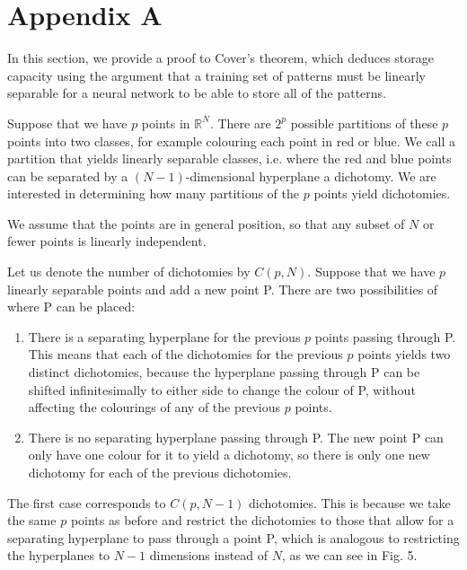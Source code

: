 \section*{Appendix A}


In this section, we provide a proof to Cover's theorem, which deduces storage capacity using the argument that a training set of patterns must be linearly separable for a neural network to be able to store all of the patterns.

Suppose that we have $p$ points in $\mathbb{R}^N$. There are $2^p$ possible partitions of these $p$ points into two classes, for example colouring each point in red or blue. We call a partition that yields linearly separable classes, i.e. where the red and blue points can be separated by a $(N-1)$-dimensional hyperplane a dichotomy. We are interested in determining how many partitions of the $p$ points yield dichotomies.

We assume that the points are in general position, so that any subset of $N$ or fewer points is linearly independent.

Let us denote the number of dichotomies by $C(p, N)$. Suppose that we have $p$ linearly separable points and add a new point P. There are two possibilities of where P can be placed:

\begin{enumerate}
    \item There is a separating hyperplane for the previous $p$ points passing through P. This means that each of the dichotomies for the previous $p$ points yields two distinct dichotomies, because the hyperplane passing through P can be shifted infinitesimally to either side to change the colour of P, without affecting the colourings of any of the previous $p$ points.
    \item There is no separating hyperplane passing through P. The new point P can only have one colour for it to yield a dichotomy, so there is only one new dichotomy for each of the previous dichotomies.
\end{enumerate}

The first case corresponds to $C(p, N-1)$ dichotomies. This is because we take the same $p$ points as before and restrict the dichotomies to those that allow for a separating hyperplane to pass through a point P, which is analogous to restricting the hyperplanes to $N-1$ dimensions instead of $N$, as we can see in Fig. 5.


